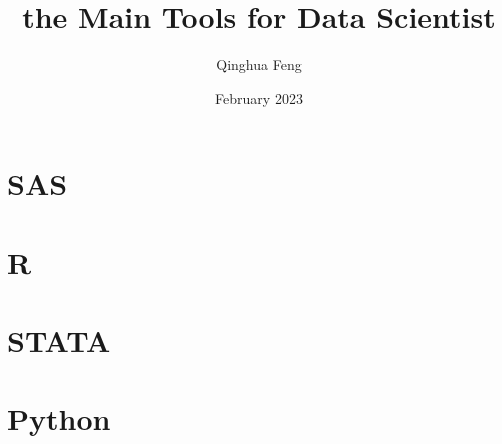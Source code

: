 \documentclass{article}
\title{the Main Tools for Data Scientist}
\author{Qinghua Feng }
\date{February 2023}
\begin{document}
\maketitle

\section{SAS}
\section{R}
\section{STATA}
\section{Python}
\end{document}
